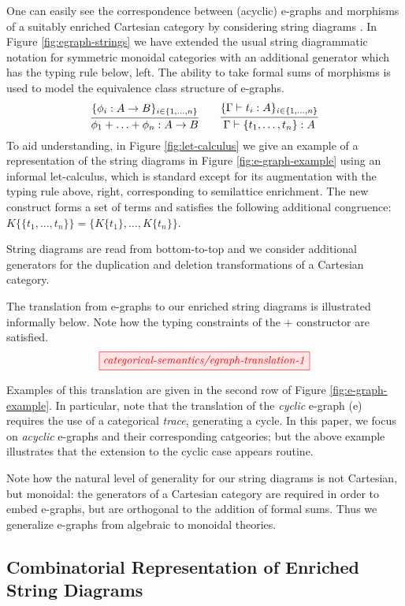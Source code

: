 One can easily see the correspondence between (acyclic) e-graphs and morphisms of a suitably enriched Cartesian category by considering string diagrams 
\cite{noauthor_09083347_nodate,joyal_geometry_1991, mellies_functorial_2006}. In Figure \ref{fig:egraph-strings} we have extended the usual string diagrammatic notation for symmetric monoidal categories with an additional generator which has the  typing rule below, left.
The ability to take formal sums of morphisms is used to model the equivalence class structure of e-graphs.  
\[
\infer{\phi_1 + \ldots + \phi_n: A \to B}{\{\phi_i: A \to B\}_{i \in \{1,\ldots,n\}}}
\qquad
\infer{\Gamma \vdash \{t_1, \ldots, t_n\}: A}{\{\Gamma \vdash t_i: A\}_{i \in \{1, \ldots, n\}}}
\]
To aid understanding, in Figure \ref{fig:let-calculus} we give an example of a representation of the string diagrams in Figure \ref{fig:e-graph-example} using an informal let-calculus, which is standard except for its augmentation with the typing rule above, right, corresponding to semilattice enrichment. The new construct forms a set of terms and satisfies the following additional congruence: $K\{\{t_1, \ldots, t_n\}\} = \{K\{t_1\}, \ldots, K\{t_n\}\}$. 

String diagrams are read from bottom-to-top and we consider additional generators for the duplication and deletion transformations of a Cartesian category.  

The translation from e-graphs to our enriched string diagrams is illustrated informally below. 
Note how the typing constraints of the $+$ constructor are satisfied.
\[
    \tikzfig{categorical-semantics/egraph-translation-1}
\]

Examples of this translation are given in the second row of Figure \ref{fig:e-graph-example}. In particular, note that the translation of the \textit{cyclic} e-graph (e)
requires the use of a categorical \textit{trace}, generating a cycle. In this paper, we focus on \textit{acyclic} e-graphs and their corresponding catgeories; but the above example illustrates that the extension to the cyclic case appears routine.

Note how the natural level of generality for our string diagrams is not Cartesian, but monoidal: the generators of a Cartesian category are required in order to embed e-graphs, but are orthogonal to the addition of formal sums. Thus we generalize e-graphs from algebraic to monoidal theories. 

\subsection*{Combinatorial Representation of Enriched String Diagrams}

